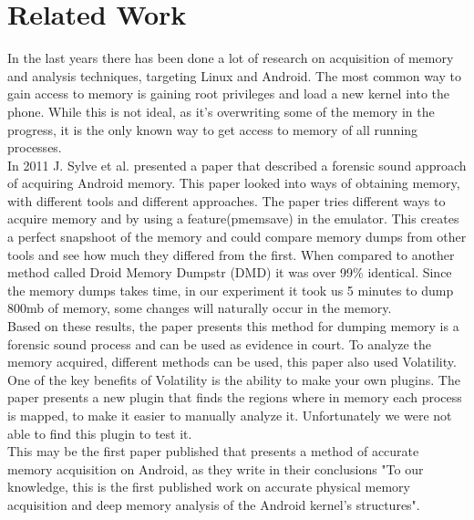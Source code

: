 \section{Related Work}
In the last years there has been done a lot of research on acquisition of memory
and analysis techniques, targeting Linux and Android. The most common way to 
gain access to memory is gaining root privileges and load a new kernel into the 
phone. While this is not ideal, as it’s overwriting some of the memory in the 
progress, it is the only known way to get access to memory of all running processes.\\

In 2011 J. Sylve et al. presented a paper that described a forensic sound 
approach of acquiring Android memory. \cite{acq_vol_android_mem} This paper looked 
into ways of obtaining memory, with different tools and different approaches. The paper 
tries different ways to acquire memory and by using a feature(pmemsave) in the emulator. 
This creates a perfect snapshoot of the memory and could compare memory dumps from other 
tools and see how much they differed from the first. When compared to another method 
called Droid Memory Dumpstr (DMD) it was over 99\% identical. Since the memory dumps 
takes time, in our experiment it took us 5 minutes to dump 800mb of memory, some 
changes will naturally occur in the memory.\\

Based on these results, the paper presents this method for dumping memory is a 
forensic sound process and can be used as evidence in court. To analyze the memory 
acquired, different methods can be used, this paper also used Volatility.
One of the key benefits of Volatility is the ability to make your 
own plugins. The paper presents a new plugin that finds the regions where in memory 
each process is mapped, to make it easier to manually analyze it. Unfortunately we were not 
able to find this plugin to test it.\\

This may be the first paper published that presents a method of accurate memory acquisition on
Android, as they write in their conclusions "To our knowledge, this is the first published work on
accurate physical memory acquisition and deep memory analysis of the Android kernel's structures".
